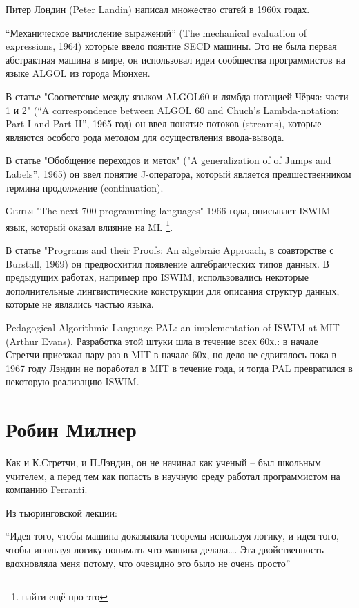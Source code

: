 \documentclass[14pt]{matmex-diploma-custom}
\begin{document}
Питер Лондин (Peter Landin) %
написал множество статей в 1960х годах.

“Механическое вычисление выражений” (The mechanical evaluation of expressions, 1964) которые ввело поянтие SECD машины. Это не была  первая абстрактная машина в мире, он использовал идеи сообщества программистов на языке ALGOL из города Мюнхен. 

В статье "Соответсвие между языком ALGOL60 и лямбда-нотацией Чёрча: части 1 и 2" (“A correspondence between ALGOL 60 and Chuch’s Lambda-notation: Part I and Part II”, 1965 год) он ввел понятие потоков (streams), которые являются особого рода методом для осуществления ввода-вывода.

В статье "Обобщение переходов и меток" ("A generalization of of Jumps and Labels”, 1965) он ввел понятие J-оператора, который является предшественником термина продолжение (continuation).

Статья "The next 700 programming languages" 1966 года, описывает ISWIM язык, который оказал влияние на ML \footnote{найти ещё про это}.

В статье "Programs and their Proofs: An algebraic Approach, в соавторстве с Burstall, 1969) он предвосхитил появление алгебраических типов данных. В предыдущих работах, например про ISWIM, использовались некоторые дополнительные лингвистические конструкции для описания структур данных, которые не являлись частью языка.

Pedagogical Algorithmic Language 
PAL: an implementation of ISWIM at MIT (Arthur Evans). Разработка этой штуки шла  в течение всех 60х.: в начале Стретчи приезжал пару раз в MIT в начале 60х, но дело не сдвигалось пока в 1967 году Лэндин не поработал в MIT в течение года, и тогда PAL превратился в некоторую реализацию ISWIM. 

\chapter{Робин Милнер}

Как и К.Стретчи, и П.Лэндин, он не начинал как ученый -- был школьным учителем, а перед тем как попасть в научную среду работал программистом на компанию Ferranti.
\begin{framed}
Из тьюринговской лекции:

“Идея того, чтобы машина доказывала теоремы используя логику, и идея того, чтобы ипользуя логику понимать что машина делала…. Эта двойственность вдохновляла меня потому, что очевидно это было не очень просто”
\end{framed}
\end{document}
